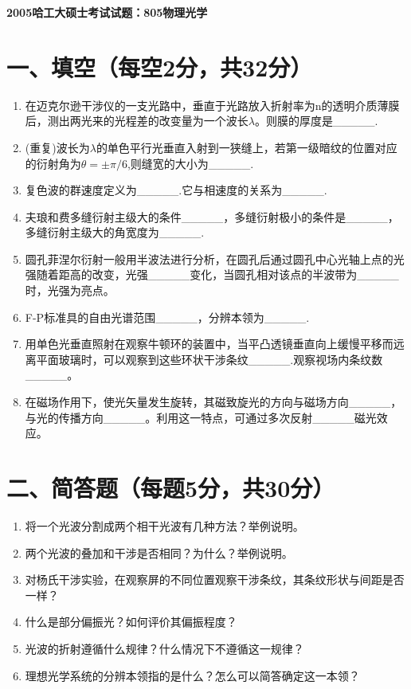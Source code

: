\documentclass[12pt, a4paper]{article}
\theoremstyle{solution}
\begin{document}
\begin{center}
\Large\textbf{2005哈工大硕士考试试题：805物理光学}
\end{center}




\section*{一、填空（每空2分，共32分）}
\begin{enumerate}
    \item 在迈克尔逊干涉仪的一支光路中，垂直于光路放入折射率为n的透明介质薄膜后，测出两光来的光程差的改变量为一个波长$\lambda$。则膜的厚度是\_\_\_\_\_.
    \item (重复)波长为\(\lambda\)的单色平行光垂直入射到一狭缝上，若第一级暗纹的位置对应的衍射角为$\theta=±\pi/6$,则缝宽的大小为\_\_\_\_\_.
    \item 复色波的群速度定义为\_\_\_\_\_.它与相速度的关系为\_\_\_\_\_.
    \item 夫琅和费多缝衍射主级大的条件\_\_\_\_\_，多缝衍射极小的条件是\_\_\_\_\_，多缝衍射主级大的角宽度为\_\_\_\_\_.
    \item 圆孔菲涅尔衍射一般用半波法进行分析，在圆孔后通过圆孔中心光轴上点的光强随着距高的改变，光强\_\_\_\_\_变化，当圆孔相对该点的半波带为\_\_\_\_\_时，光强为亮点。
    \item F-P标准具的自由光谱范围\_\_\_\_\_，分辨本领为\_\_\_\_\_.
    \item 用单色光垂直照射在观察牛顿环的装置中，当平凸透镜垂直向上缓慢平移而远离平面玻璃时，可以观察到这些环状干涉条纹\_\_\_\_\_.观察视场内条纹数\_\_\_\_\_。
    \item 在磁场作用下，使光矢量发生旋转，其磁致旋光的方向与磁场方向\_\_\_\_\_，与光的传播方向\_\_\_\_\_。利用这一特点，可通过多次反射\_\_\_\_\_磁光效应。

\end{enumerate}
\section*{二、简答题（每题5分，共30分）}
\begin{enumerate}
    \item 将一个光波分割成两个相干光波有几种方法？举例说明。
    \item 两个光波的叠加和干涉是否相同？为什么？举例说明。
    \item 对杨氏干涉实验，在观察屏的不同位置观察干涉条纹，其条纹形状与间距是否一样？
    \item 什么是部分偏振光？如何评价其偏振程度？
    \item 光波的折射遵循什么规律？什么情况下不遵循这一规律？
    \item 理想光学系统的分辨本领指的是什么？怎么可以简答确定这一本领？
\end{enumerate}
\end{document}
